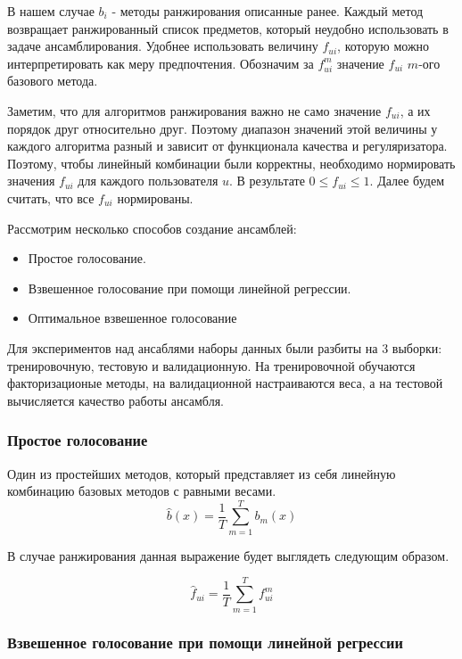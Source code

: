 \documentclass[14pt]{extarticle}
\begin{document}
В нашем случае $b_i$ - методы ранжирования описанные ранее. Каждый метод возвращает ранжированный список предметов, который неудобно использовать в задаче ансамблирования. Удобнее использовать величину $f_{ui}$, которую можно интерпретировать как меру предпочтения. Обозначим  за $f_{ui}^m$ значение $f_{ui}$ $m$-ого базового метода.

Заметим, что для алгоритмов ранжирования  важно не само значение $f_{ui}$, а их порядок друг относительно друг. Поэтому диапазон значений этой величины у каждого алгоритма разный и зависит от функционала качества и регуляризатора. Поэтому, чтобы линейный комбинации были корректны,  необходимо нормировать значения $f_{ui}$ для каждого пользователя $u$. В результате $0 \leq f_{ui} \leq 1$. Далее будем считать, что все $f_{ui}$ нормированы.

  Рассмотрим несколько способов создание ансамблей:
 
\begin{itemize}
\item Простое голосование. 
\item Взвешенное голосование при помощи линейной регрессии.
\item Оптимальное взвешенное голосование
\end{itemize}
Для экспериментов над ансаблями наборы данных были разбиты на 3 выборки: тренировочную, тестовую и валидационную. На тренировочной обучаются факторизационые методы, на валидационной настраиваются веса, а на тестовой вычисляется качество работы ансамбля. 

\subsubsection*{Простое голосование}
Один из простейших методов, который представляет из себя линейную комбинацию базовых методов с равными весами.
\begin{equation*}
 	\hat{b}(x)= \frac{1}{T}\sum_{m = 1} ^ T b_m(x)
\end{equation*}

В случае ранжирования данная выражение будет выглядеть следующим образом.

\begin{equation*}
	\hat{f}_{ui} = \frac{1}{T}\sum_{m = 1} ^ T f_{ui}^m
\end{equation*}
\subsubsection*{Взвешенное голосование при помощи линейной регрессии}
\end{document}
